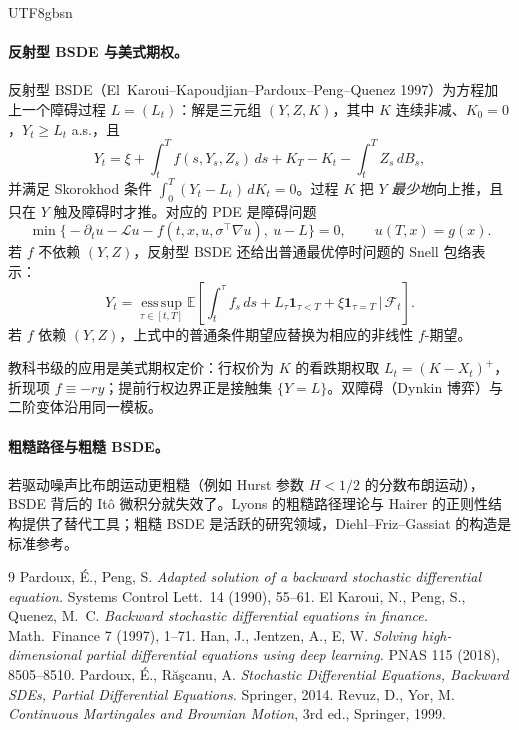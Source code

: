 \documentclass{article}
\theoremstyle{plain}
\theoremstyle{definition}
\theoremstyle{remark}
\newcommand{\E}{\mathbb{E}}
\newcommand{\F}{\mathcal{F}}
\newcommand{\Lc}{\mathcal{L}}
\begin{document}
\begin{CJK*}{UTF8}{gbsn}
\paragraph{反射型 BSDE 与美式期权。} 反射型 BSDE（El~Karoui--Kapoudjian--Pardoux--Peng--Quenez 1997）为方程加上一个障碍过程 $L = (L_t)$：解是三元组 $(Y, Z, K)$，其中 $K$ 连续非减、$K_0 = 0$，$Y_t \ge L_t$ a.s.，且
\[
  Y_t = \xi + \int_t^T f(s, Y_s, Z_s)\,ds + K_T - K_t - \int_t^T Z_s\, dB_s,
\]
并满足 Skorokhod 条件 $\int_0^T (Y_t - L_t)\,dK_t = 0$。过程 $K$ 把 $Y$ \emph{最少地}向上推，且只在 $Y$ 触及障碍时才推。对应的 PDE 是障碍问题
\[
  \min\!\big\{ -\partial_t u - \Lc u - f(t, x, u, \sigma^{\top}\nabla u),\ u - L \big\} = 0, \qquad u(T, x) = g(x).
\]
若 $f$ 不依赖 $(Y,Z)$，反射型 BSDE 还给出普通最优停时问题的 Snell 包络表示：
\[
  Y_t = \operatorname*{ess\,sup}_{\tau \in [t, T]} \E\!\left[\int_t^\tau f_s\, ds + L_\tau \mathbf{1}_{\tau < T} + \xi \mathbf{1}_{\tau = T} \,\bigg|\, \F_t\right].
\]
若 $f$ 依赖 $(Y,Z)$，上式中的普通条件期望应替换为相应的非线性 $f$-期望。

教科书级的应用是美式期权定价：行权价为 $K$ 的看跌期权取 $L_t = (K - X_t)^+$，折现项 $f \equiv -r y$；提前行权边界正是接触集 $\{Y = L\}$。双障碍（Dynkin 博弈）与二阶变体沿用同一模板。

\paragraph{粗糙路径与粗糙 BSDE。} 若驱动噪声比布朗运动更粗糙（例如 Hurst 参数 $H < 1/2$ 的分数布朗运动），BSDE 背后的 It\^o 微积分就失效了。Lyons 的粗糙路径理论与 Hairer 的正则性结构提供了替代工具；粗糙 BSDE 是活跃的研究领域，Diehl--Friz--Gassiat 的构造是标准参考。

\begin{thebibliography}{9}
 Pardoux, \'E., Peng, S. \emph{Adapted solution of a backward stochastic differential equation.} Systems Control Lett.\ 14 (1990), 55--61.
 El Karoui, N., Peng, S., Quenez, M.~C. \emph{Backward stochastic differential equations in finance.} Math.\ Finance 7 (1997), 1--71.
 Han, J., Jentzen, A., E, W. \emph{Solving high-dimensional partial differential equations using deep learning.} PNAS 115 (2018), 8505--8510.
 Pardoux, \'E., R\u{a}\c{s}canu, A. \emph{Stochastic Differential Equations, Backward SDEs, Partial Differential Equations.} Springer, 2014.
 Revuz, D., Yor, M. \emph{Continuous Martingales and Brownian Motion}, 3rd ed., Springer, 1999.
\end{thebibliography}

\clearpage %
\end{CJK*}
\end{document}
